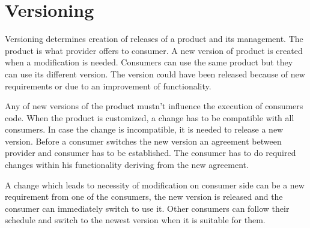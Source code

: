 \chapter{Versioning}
\label{chap:versioning}

Versioning determines creation of releases of a product and its management. The product is what provider offers to consumer. A new version of product is created when a modification is needed. Consumers can use the same product but they can use its different version. The version could have been released because of new requirements or due to an improvement of functionality. 

Any of new versions of the product mustn't influence the execution of consumers code. When the product is customized, a change has to be compatible with all consumers. In case the change is incompatible, it is needed to release a new version. Before a consumer switches the new version an agreement between provider and consumer has to be established. The consumer has to do required changes within his functionality deriving from the new agreement.

A change which leads to necessity of modification on consumer side can be a new requirement from one of the consumers, the new version is released and the consumer can immediately switch to use it. Other consumers can follow their schedule and switch to the newest version when it is suitable for them. 

